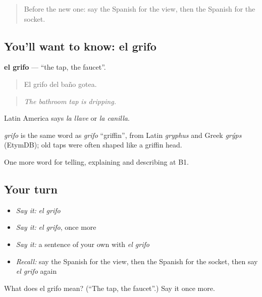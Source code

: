 \label{lesson:ES-C664-grifo}



\begin{quote}
Before the new one: say the Spanish for the view, then the Spanish for the socket.
\end{quote}

\subsection*{You'll want to know: el grifo}
\textbf{el grifo} — \textquotedblleft{}the tap, the faucet\textquotedblright{}.

\begin{quote}
El grifo del baño gotea.
\end{quote}

\begin{quote}
\emph{The bathroom tap is dripping.}
\end{quote}

Latin America says \emph{la llave} or \emph{la canilla}.

\begin{cousinweb}
\emph{grifo} is the same word as \emph{grifo} \textquotedblleft{}griffin\textquotedblright{}, from Latin \emph{gryphus} and Greek \emph{grýps} (EtymDB); old taps were often shaped like a griffin head.
\end{cousinweb}

\begin{grammarlens}[title={What you've built}]
One more word for telling, explaining and describing at B1.
\end{grammarlens}

\subsection*{Your turn}
\begin{itemize}
\raggedright
  \item \emph{Say it:} \emph{el grifo}
  \item \emph{Say it:} \emph{el grifo}, once more
  \item \emph{Say it:} a sentence of your own with \emph{el grifo}
  \item \emph{Recall:} say the Spanish for the view, then the Spanish for the socket, then say \emph{el grifo} again
\end{itemize}

\begin{tcolorbox}[breakable,colback=teal!4,colframe=teal!35!black,title={Before you move on}]
What does el grifo mean? (\textquotedblleft{}The tap, the faucet\textquotedblright{}.) Say it once more.
\end{tcolorbox}
